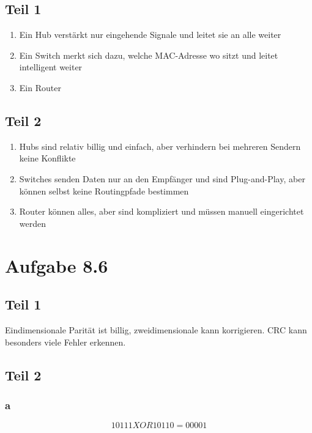 \documentclass[10pt,a4paper]{article}
\begin{document}
\subsection{Teil 1}

\begin{enumerate}[label={\alph*)}]
\item Ein Hub verstärkt nur eingehende Signale und leitet sie an alle weiter
\item Ein Switch merkt sich dazu, welche MAC-Adresse wo sitzt und leitet
  intelligent weiter
\item Ein Router
\end{enumerate}

\subsection{Teil 2}

\begin{enumerate}[label={\alph*)}]
\item Hubs sind relativ billig und einfach, aber verhindern bei mehreren Sendern
  keine Konflikte
\item Switches senden Daten nur an den Empfänger und sind Plug-and-Play, aber
  können selbst keine Routingpfade bestimmen
\item Router können alles, aber sind kompliziert und müssen manuell eingerichtet
  werden
\end{enumerate}

\section{Aufgabe 8.6}

\subsection{Teil 1}

Eindimensionale Parität ist billig, zweidimensionale kann korrigieren. CRC kann
besonders viele Fehler erkennen.

\subsection{Teil 2}

\subsubsection{a}

\begin{equation}
  10111 XOR 10110 = 00001
\end{equation}
\end{document}
